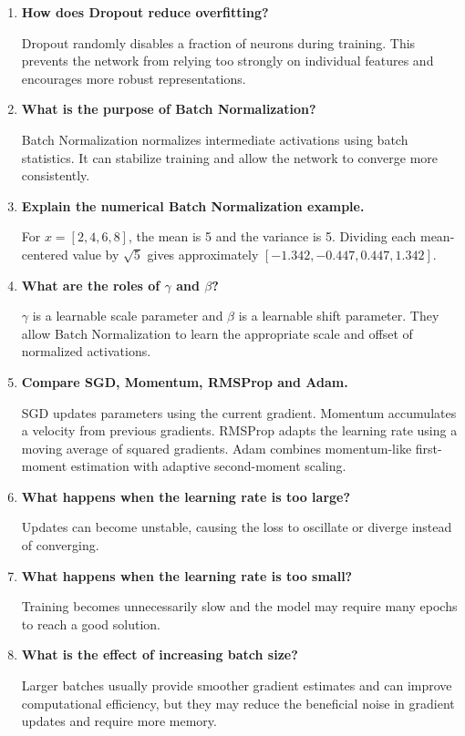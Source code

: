 \documentclass[12pt,a4paper]{article}
\begin{document}
\begin{enumerate}[leftmargin=*]
\item \textbf{How does Dropout reduce overfitting?}

Dropout randomly disables a fraction of neurons during training. This prevents
the network from relying too strongly on individual features and encourages
more robust representations.

\item \textbf{What is the purpose of Batch Normalization?}

Batch Normalization normalizes intermediate activations using batch statistics.
It can stabilize training and allow the network to converge more consistently.

\item \textbf{Explain the numerical Batch Normalization example.}

For $x=[2,4,6,8]$, the mean is 5 and the variance is 5. Dividing each
mean-centered value by $\sqrt{5}$ gives approximately
$[-1.342,-0.447,0.447,1.342]$.

\item \textbf{What are the roles of $\gamma$ and $\beta$?}

$\gamma$ is a learnable scale parameter and $\beta$ is a learnable shift
parameter. They allow Batch Normalization to learn the appropriate scale and
offset of normalized activations.

\item \textbf{Compare SGD, Momentum, RMSProp and Adam.}

SGD updates parameters using the current gradient. Momentum accumulates a
velocity from previous gradients. RMSProp adapts the learning rate using a
moving average of squared gradients. Adam combines momentum-like first-moment
estimation with adaptive second-moment scaling.

\item \textbf{What happens when the learning rate is too large?}

Updates can become unstable, causing the loss to oscillate or diverge instead
of converging.

\item \textbf{What happens when the learning rate is too small?}

Training becomes unnecessarily slow and the model may require many epochs to
reach a good solution.

\item \textbf{What is the effect of increasing batch size?}

Larger batches usually provide smoother gradient estimates and can improve
computational efficiency, but they may reduce the beneficial noise in gradient
updates and require more memory.


\end{enumerate}
\end{document}
